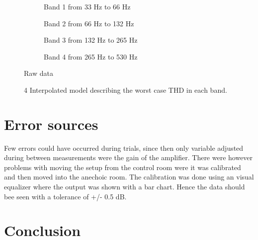\begin{figure}[H]
\centering
\begin{subfigure}[t]{0.45\textwidth}
    \centering
    
    \caption{Band 1 from 33 Hz to 66 Hz}
    \label{fig:Band1Model}
\end{subfigure}
\begin{subfigure}[t]{0.45\textwidth}
    \centering
    
    \caption{Band 2 from 66 Hz to 132 Hz}
    \label{fig:Band2Model}
\end{subfigure}
\begin{subfigure}[t]{0.45\textwidth}
    \centering
    
    \caption{Band 3 from 132 Hz to 265 Hz}
    \label{fig:Band3Model}
\end{subfigure}
\begin{subfigure}[t]{0.45\textwidth}
    \centering
    
    \caption{Band 4 from 265 Hz to 530 Hz}
    \label{fig:Band4Model}
\end{subfigure}
\caption{Raw data}
\label{fig:THDComparisson}
\end{figure} 


\begin{figure}[H]
    \centering
    
    \caption{4 Interpolated model describing the worst case THD in each band.}
    \label{fig:CombinedModel}
\end{figure}






\section{Error sources}
Few errors could have occurred during trials, since then only variable adjusted during between measurements were the gain of the amplifier. There were however problems with moving the setup from the control room were it was calibrated and then moved into the anechoic room. The
calibration was done using an visual equalizer where the output was shown with a bar chart. Hence the data should bee seen with a tolerance of +/- 0.5 dB.

\section{Conclusion}

